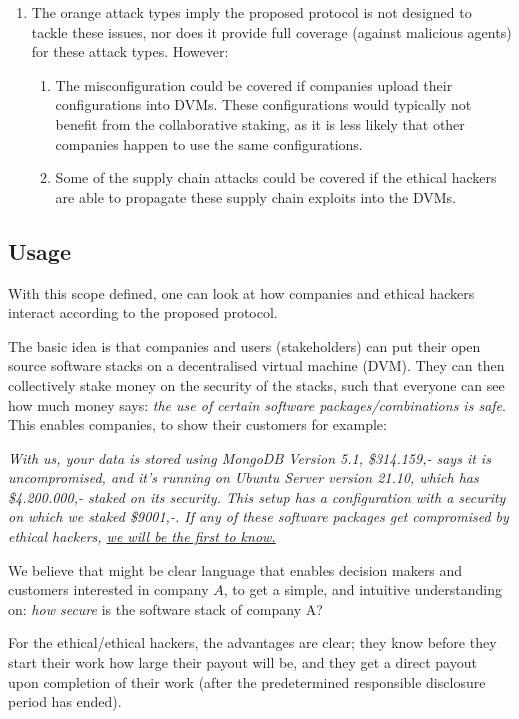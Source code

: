 \begin{enumerate} 
    \item The orange attack types imply the proposed protocol is not designed to tackle these issues, nor does it provide full coverage (against malicious agents) for these attack types. However:
    \begin{enumerate}
        \item The misconfiguration could be covered if companies upload their configurations into DVMs. These configurations would typically not benefit from the collaborative staking, as it is less likely that other companies happen to use the same configurations.
        \item Some of the supply chain attacks could be covered if the ethical hackers are able to propagate these supply chain exploits into the DVMs.
    \end{enumerate}
\end{enumerate}

\subsection{Usage}
\noindent With this scope defined, one can look at how companies and ethical hackers interact according to the proposed protocol.

\noindent The basic idea is that companies and users (stakeholders) can put their open source software stacks on a decentralised virtual machine (DVM). They can then collectively stake money on the security of the stacks, such that everyone can see how much money says: \textit{the use of certain software packages/combinations is safe}. This enables companies, to show their customers for example:

\noindent \textit{With us, your data is stored using MongoDB Version 5.1, \$314.159,- says it is uncompromised, and it's running on Ubuntu Server version 21.10, which has \$4.200.000,- staked on its security. This setup has a configuration with a security on which we staked \$9001,-. If any of these software packages get compromised by ethical hackers, \underline{we will be the first to know.}}

\noindent We believe that might be clear language that enables decision makers and customers interested in company $A$, to get a simple, and intuitive understanding on: \textit{how secure} is the software stack of company A?

\noindent For the ethical/ethical hackers, the advantages are clear; they know before they start their work how large their payout will be, and they get a direct payout upon completion of their work (after the predetermined responsible disclosure period has ended).

